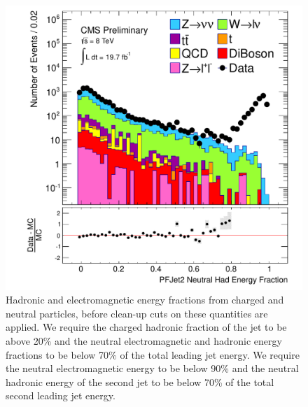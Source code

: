 \begin{figure}[!Hhtb]
\begin{center}
  \includegraphics[scale=0.31]     {Figures/sus13009/nocut/prelimLabels/PFAK5JetNeuHadEngFrac2.pdf}
  \caption{Hadronic and electromagnetic energy fractions from charged 
and neutral particles, before clean-up cuts on these quantities are 
applied. We require the charged 
hadronic fraction of the jet to be above 20\% and the neutral electromagnetic and hadronic energy fractions to be below 70\% of the total leading jet energy.
We require the neutral electromagnetic energy to be below 90\% and the neutral hadronic energy of the second jet to be below 70\% of the total second leading jet energy. }
         \label{fig:ANA_energy_fraction_cleanup}
  \end{center}
\end{figure}
%
